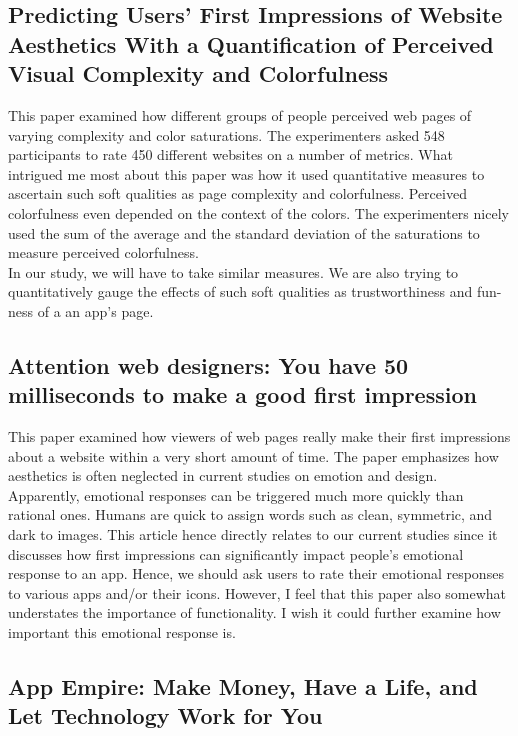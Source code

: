 \documentclass{article}
\begin{document}
\subsection{Predicting Users’ First Impressions of Website Aesthetics With a Quantiﬁcation of Perceived Visual Complexity and Colorfulness}

This paper examined how different groups of people perceived web pages of varying complexity and color saturations. The experimenters asked 548 participants to rate 450 different websites on a number of metrics. What intrigued me most about this paper was how it used quantitative measures to ascertain such soft qualities as page complexity and colorfulness. Perceived colorfulness even depended on the context of the colors. The experimenters nicely used the sum of the average and the standard deviation of the saturations to measure perceived colorfulness. \\

In our study, we will have to take similar measures. We are also trying to quantitatively gauge the effects of such soft qualities as trustworthiness and fun-ness of a an app's page.

\subsection{Attention web designers: You have 50 milliseconds to make a good
ﬁrst impression}

This paper examined how viewers of web pages really make their first impressions about a website within a very short amount of time. The paper emphasizes how aesthetics is often neglected in current studies on emotion and design. Apparently, emotional responses can be triggered much more quickly than rational ones. Humans are quick to assign words such as clean, symmetric, and dark to images. This article hence directly relates to our current studies since it discusses how first impressions can significantly impact people's emotional response to an app. Hence, we should ask users to rate their emotional responses to various apps and/or their icons. However, I feel that this paper also somewhat understates the importance of functionality. I wish it could further examine how important this emotional response is.

\subsection{App Empire: Make Money, Have a Life, and Let Technology Work for You}
\end{document}
